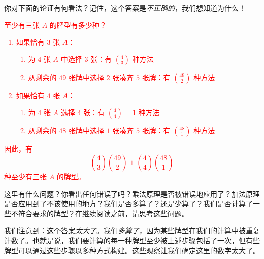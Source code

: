 你对下面的论证有何看法？记住，这个答案是\emph{不正确的}，我们想知道为什么！

\begin{example}[找出缺陷]

    \textcolor{red}{
        至少有三张 $A$ 的牌型有多少种？
        \begin{enumerate}[label=(\arabic*)]
            \item 如果恰有 $3$ 张 $A$：
                  \begin{enumerate}[label=(\alph*)]
                      \item 为 $4$ 张 $A$ 中选择 $3$ 张：有 ${4 \choose 3}$ 种方法
                      \item 从剩余的 $49$ 张牌中选择 $2$ 张凑齐 $5$ 张牌：有 ${49 \choose 2}$ 种方法
                  \end{enumerate}
            \item 如果恰有 $4$ 张 $A$：
                  \begin{enumerate}[label=(\alph*)]
                      \item 为 $4$ 张 $A$ 选择 $4$ 张：有 ${4 \choose 4} = 1$ 种方法
                      \item 从剩余的 $48$ 张牌中选择 $1$ 张凑齐 $5$ 张牌：有 ${48 \choose 1}$ 种方法
                  \end{enumerate}
        \end{enumerate}
        因此，有
        \[{4 \choose 3}{49 \choose 2}+{4 \choose 4}{48 \choose 1}\]
        种至少有三张 $A$ 的牌型。
    }

    这里有什么问题？你看出任何错误了吗？乘法原理是否被错误地应用了？加法原理是否应用到了不该使用的地方？我们是否多算了？还是少算了？我们是否计算了一些不符合要求的牌型？在继续阅读之前，请思考这些问题。

    我们注意到：这个答案\emph{太大了}。我们\emph{多算了}，因为某些牌型在我们的计算中被重复计数了。也就是说，我们要计算的每一种牌型至少被上述步骤包括了一次，但有些牌型可以通过这些步骤以多种方式构建。这些观察让我们确定这里的数字太大了。


\end{example}
